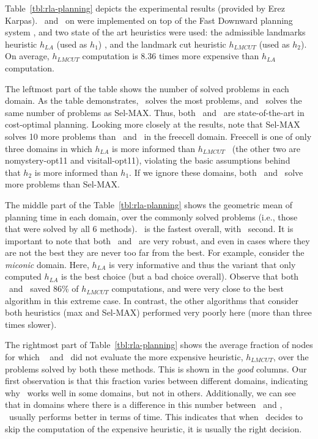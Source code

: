 Table~\ref{tbl:rla-planning} depicts the experimental results
(provided by Erez Karpas). \lazyastar~and \rationallazyastar~on were
implemented on top of the Fast Downward
planning system \cite{helmert:jair-2006}, and two state
of the art heuristics were used: the admissible landmarks heuristic $h_{LA}$ (used as $h_1$)
\cite{karpas-domshlak:ijcai-2009}, and the landmark cut heuristic $h_{LMCUT}$
\cite{helmert-domshlak:icaps-2009} (used as $h_2$).
On average, $h_{LMCUT}$ computation is 8.36 times more expensive than $h_{LA}$
computation.

The leftmost part of the table shows the number of solved problems in each
domain. As the table demonstrates, \rationallazyastar~solves the most problems,
and \lazyastar~solves the same number of problems as Sel-MAX. Thus, both
\lazyastar~and \rationallazyastar~are state-of-the-art in cost-optimal planning.
Looking more closely at the results, note that Sel-MAX
solves 10 more problems than \lazyastar~and \rationallazyastar~in the freecell
domain. Freecell is one of only three domains in which $h_{LA}$ is more
informed than $h_{LMCUT}$ ~(the other two are nomystery-opt11 and
visitall-opt11), violating the basic assumptions behind 
\lazyastar~ that $h_2$ is more informed than $h_1$. If
we ignore these domains, both \lazyastar~and \rationallazyastar~solve more
problems than Sel-MAX.

The middle part of the Table~\ref{tbl:rla-planning} shows the geometric mean of
planning time in each domain, over the commonly solved problems (i.e., those
that were solved by all 6 methods). \rationallazyastar~is the fastest overall,
with \lazyastar~second. It is important to note that both \lazyastar~and
\rationallazyastar~are very robust, and even in cases where they are not the
best they are never too far from the best. For example, consider the {\em
miconic} domain. Here,  $h_{LA}$ is very informative and thus the variant that
only computed $h_{LA}$ is the best choice (but a bad choice overall). Observe
that both  \lazyastar~and \rationallazyastar~saved 86\% of $h_{LMCUT}$
computations, and were very close to the best algorithm in this extreme case.
In contrast, the other algorithms that consider both heuristics (max and
Sel-MAX) performed very poorly here (more than three times slower).

The rightmost part of Table~\ref{tbl:rla-planning} shows the average
fraction of nodes for which \lazyastar~ and \rationallazyastar~did not evaluate
the more expensive heuristic, $h_{LMCUT}$, over the problems solved by both
these methods.
This is shown in the {\em good} columns. Our first observation is that this
fraction varies between different domains, indicating why \lazyastar~works well
in some domains, but not in others. Additionally, we can see that in domains
where there is a difference in this number between \lazyastar~and
\rationallazyastar, \rationallazyastar~usually performs better in terms of
time. This indicates that when \rationallazyastar~decides to skip the
computation of the expensive heuristic, it is usually the right
decision. 

